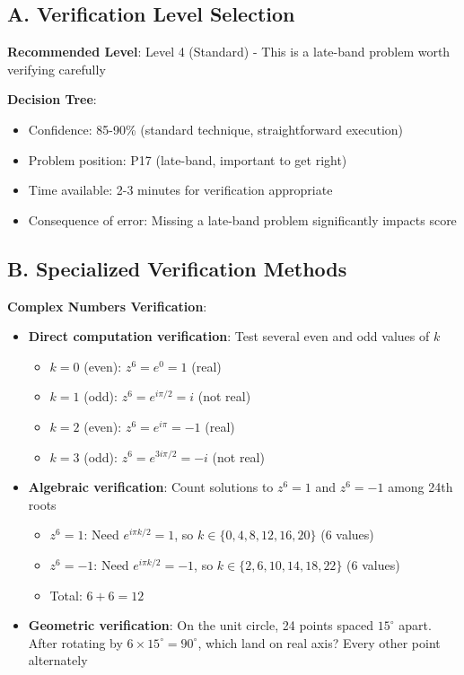 \documentclass[]{article}
\begin{document}
\begin{verificationbox}
\subsection*{A. Verification Level Selection}

\textbf{Recommended Level}: Level 4 (Standard) - This is a late-band problem worth verifying carefully

\textbf{Decision Tree}:
\begin{itemize}[leftmargin=*]
    \item Confidence: 85-90\% (standard technique, straightforward execution)
    \item Problem position: P17 (late-band, important to get right)
    \item Time available: 2-3 minutes for verification appropriate
    \item Consequence of error: Missing a late-band problem significantly impacts score
\end{itemize}

\subsection*{B. Specialized Verification Methods}

\textbf{Complex Numbers Verification}:
\begin{itemize}[leftmargin=*]
    \item \textbf{Direct computation verification}: Test several even and odd values of $k$
    \begin{itemize}
        \item $k=0$ (even): $z^6 = e^0 = 1$ (real) \checkmark
        \item $k=1$ (odd): $z^6 = e^{i\pi/2} = i$ (not real) \checkmark
        \item $k=2$ (even): $z^6 = e^{i\pi} = -1$ (real) \checkmark
        \item $k=3$ (odd): $z^6 = e^{3i\pi/2} = -i$ (not real) \checkmark
    \end{itemize}
    \item \textbf{Algebraic verification}: Count solutions to $z^6 = 1$ and $z^6 = -1$ among 24th roots
    \begin{itemize}
        \item $z^6 = 1$: Need $e^{i\pi k/2} = 1$, so $k \in \{0, 4, 8, 12, 16, 20\}$ (6 values)
        \item $z^6 = -1$: Need $e^{i\pi k/2} = -1$, so $k \in \{2, 6, 10, 14, 18, 22\}$ (6 values)
        \item Total: $6 + 6 = 12$ \checkmark
    \end{itemize}
    \item \textbf{Geometric verification}: On the unit circle, 24 points spaced $15^\circ$ apart. After rotating by $6 \times 15^\circ = 90^\circ$, which land on real axis? Every other point alternately
\end{itemize}


\end{verificationbox}
\end{document}
